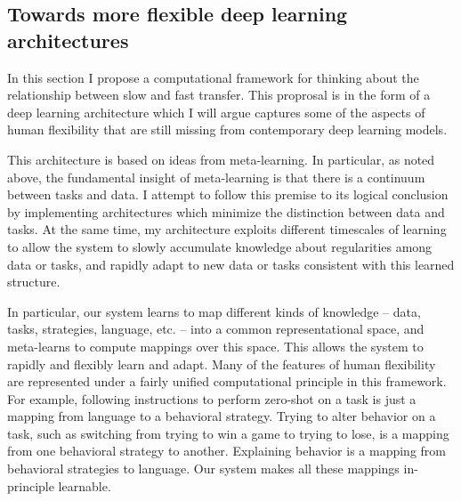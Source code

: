\documentclass[11pt]{article}
\begin{document}
\subsection{Towards more flexible deep learning architectures}

In this section I propose a computational framework for thinking about the relationship between slow and fast transfer. This proprosal is in the form of a deep learning architecture which I will argue captures some of the aspects of human flexibility that are still missing from contemporary deep learning models.\par

This architecture is based on ideas from meta-learning. In particular, as noted above, the fundamental insight of meta-learning is that there is a continuum between tasks and data. I attempt to follow this premise to its logical conclusion by implementing architectures which minimize the distinction between data and tasks. At the same time, my architecture exploits different timescales of learning to allow the system to slowly accumulate knowledge about regularities among data or tasks, and rapidly adapt to new data or tasks consistent with this learned structure. \par

In particular, our system learns to map different kinds of knowledge -- data, tasks, strategies, language, etc. -- into a common representational space, and meta-learns to compute mappings over this space. This allows the system to rapidly and flexibly learn and adapt. Many of the features of human flexibility are represented under a fairly unified computational principle in this framework. For example, following instructions to perform zero-shot on a task is just a mapping from language to a behavioral strategy. Trying to alter behavior on a task, such as switching from trying to win a game to trying to lose, is a mapping from one behavioral strategy to another. Explaining behavior is a mapping from behavioral strategies to language. Our system makes all these mappings in-principle learnable. \par 
\end{document}
